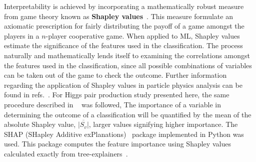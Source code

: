 Interpretability is achieved by incorporating a mathematically robust measure from game theory known as \textbf{Shapley values}~\cite{shapley1951notes}. This measure formulate an axiomatic prescription for fairly distributing the payoff of a game amongst the players in a $n$-player cooperative game. When applied to ML, Shapley values estimate the significance of the features used in the classification. The process naturally and mathematically lends itself to examining the correlations amongst the features used in the classification, since all possible combinations of variables can be taken out of the game to check the outcome. Further information regarding the application of Shapley values in particle physics analysis can be found in refs.~\cite{Grojean:2020ech,Alvestad:2021sje,Cornell:2021gut}.  For Higgs pair production study presented here, the same procedure described in ~\cite{Grojean:2020ech} was followed, The importance of a variable in determining the outcome of a classification will be quantified by the mean of the absolute Shapley value, $\overline{|S_v|}$, larger values signifying higher importance. The SHAP (SHapley Additive exPlanations)~\cite{NIPS2017_7062} package implemented in Python was used. This package computes the feature importance using Shapley values calculated exactly from  tree-explainers~\cite{2018arXiv180203888L,Lundberg:2020vt}.\\
